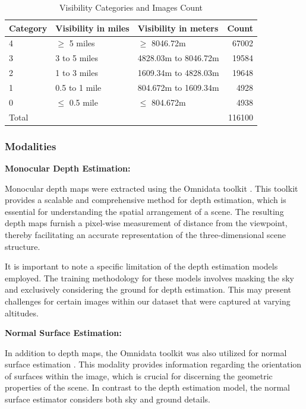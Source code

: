 \begin{table}[htbp]
\centering
\caption{Visibility Categories and Images Count}
\label{tab:vis_img_count}
\begin{tabular}{@{}lllr@{}}
\toprule
Category & Visibility in miles  & Visibility in meters & Count  \\
\midrule
4        & $\geq$ 5 miles             &     $\geq$ 8046.72m                 & 67002  \\
3        & 3 to 5 miles         &      4828.03m to  8046.72m        & 19584  \\
2        & 1 to 3 miles         &            1609.34m to 4828.03m         & 19648  \\
1        & 0.5 to 1 mile  &               804.672m to 1609.34m      & 4928  \\
0        & $\leq$ 0.5 mile   &     $\leq$ 804.672m                 & 4938  \\
\midrule
Total    &    &                      &  116100  \\
\bottomrule
\end{tabular}
\end{table}


\subsubsection{Modalities}
\label{modalities}

\textbf{Monocular Depth Estimation:}

Monocular depth maps were extracted using the Omnidata toolkit \cite{eftekhar2021omnidata, ranftl2021vision}. This toolkit provides a scalable and comprehensive method for depth estimation, which is essential for understanding the spatial arrangement of a scene. The resulting depth maps furnish a pixel-wise measurement of distance from the viewpoint, thereby facilitating an accurate representation of the three-dimensional scene structure.

It is important to note a specific limitation of the depth estimation models employed. The training methodology for these models involves masking the sky and exclusively considering the ground for depth estimation. This may present challenges for certain images within our dataset that were captured at varying altitudes.

\textbf{Normal Surface Estimation:}

In addition to depth maps, the Omnidata toolkit was also utilized for normal surface estimation \cite{eftekhar2021omnidata}. This modality provides information regarding the orientation of surfaces within the image, which is crucial for discerning the geometric properties of the scene. In contrast to the depth estimation model, the normal surface estimator considers both sky and ground details.


